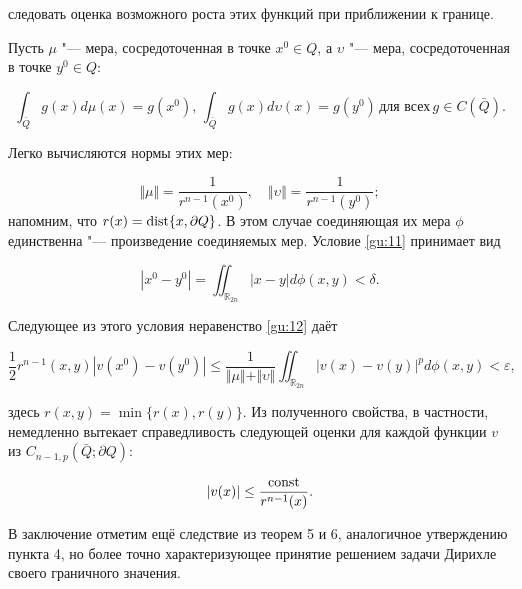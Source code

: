 следовать оценка возможного роста этих функций при приближении к границе.



Пусть $\mu$ "--- мера, сосредоточенная в точке $x^0 \in Q$, а $\upsilon$ "--- мера, сосредоточенная в точке $y^0 \in Q$: 

$$

\int_{\bar {Q}} g(x) d\mu(x) = g(x^0),\, \int_{\bar {Q}} g(x) d\upsilon(x) = g(y^0) \, \mbox{для всех} \, g \in C(\bar {Q}).

$$ 

Легко вычисляются нормы этих мер: 

$$\Vert\mu\Vert = \frac{1}{r^{n-1}(x^0)} ,\quad  \Vert\upsilon\Vert = \frac{1}{r^{n-1}(y^0)};$$ напомним, что $r(x) = {\mathop{\rm dist}\nolimits}\{ x, \partial Q\}$. В этом случае соединяющая их мера $\phi$ единственна "--- произведение соединяемых мер. Условие \eqref{gu:11} принимает вид

$$

|x^0 - y^0| = \iint_{{\mathbb R}_{2n}} |x - y| d\phi (x, y) < \delta. 

$$

Следующее из этого условия неравенство \eqref{gu:12} даёт

$$

\frac{1}{2} r^{n-1}(x, y) |v(x^0) - v(y^0)| \leq  \frac{1}{\Vert\mu\Vert + \Vert\upsilon\Vert} \iint_{{\mathbb R}_{2n}} |v(x) - v(y)|^p d\phi (x, y) < \varepsilon, 

$$

здесь $r(x, y) = \min\{ r(x), r(y)\}$. Из полученного свойства, в частности, немедленно вытекает справедливость следующей оценки для каждой функции $v$ из $C_{n-1,p}(\bar {Q} ; \partial Q)$:

$$

|v(x)| \leq \frac{\mathop{\rm const}\nolimits }{r^{n-1}(x)}.

$$





В заключение отметим ещё следствие из теорем 5 и 6, аналогичное утверждению пункта 4, но более точно характеризующее принятие решением задачи Дирихле своего граничного значения.



\smallskip




